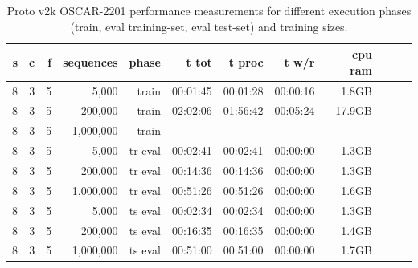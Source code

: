 \begin{table}[H]
\centering
\caption{Proto v2k OSCAR-2201 performance measurements for different execution phases (train, eval training-set, eval test-set) and training sizes.}
\label{tab:protov2k-oscar-performance-multisentencePredictions}
\begin{tabular}{rrrrrrrrrrrr}
\toprule
\textbf{s} & \textbf{c} & \textbf{f} & \textbf{sequences} & \textbf{phase} & \textbf{t tot} & \textbf{t proc} & \textbf{t w/r} & \textbf{cpu ram} \\
\midrule
8 & 3 & 5 & 5,000       & train   & 00:01:45 & 00:01:28 & 00:00:16 & 1.8GB \\
8 & 3 & 5 & 200,000     & train   & 02:02:06 & 01:56:42 & 00:05:24 & 17.9GB \\
8 & 3 & 5 & 1,000,000   & train   & - & - & - & - \\
8 & 3 & 5 & 5,000       & tr eval & 00:02:41 & 00:02:41 & 00:00:00 & 1.3GB \\
8 & 3 & 5 & 200,000     & tr eval & 00:14:36 & 00:14:36 & 00:00:00 & 1.3GB \\
8 & 3 & 5 & 1,000,000   & tr eval & 00:51:26 & 00:51:26 & 00:00:00 & 1.6GB \\
8 & 3 & 5 & 5,000       & ts eval & 00:02:34 & 00:02:34 & 00:00:00 & 1.3GB \\
8 & 3 & 5 & 200,000     & ts eval & 00:16:35 & 00:16:35 & 00:00:00 & 1.4GB \\
8 & 3 & 5 & 1,000,000   & ts eval & 00:51:00 & 00:51:00 & 00:00:00 & 1.7GB \\
\bottomrule
\end{tabular}
\end{table}

